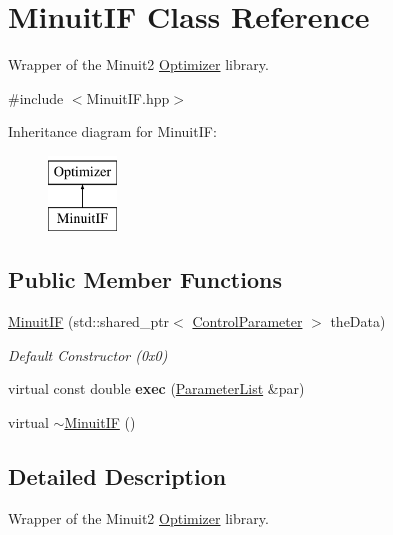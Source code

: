\hypertarget{class_minuit_i_f}{\section{Minuit\-I\-F Class Reference}
\label{class_minuit_i_f}
}


Wrapper of the Minuit2 \hyperlink{class_optimizer}{Optimizer} library.  




{\ttfamily \#include $<$Minuit\-I\-F.\-hpp$>$}

Inheritance diagram for Minuit\-I\-F\-:\begin{figure}[H]
\begin{center}
\leavevmode
\includegraphics[height=2.000000cm]{class_minuit_i_f}
\end{center}
\end{figure}
\subsection*{Public Member Functions}
\begin{DoxyCompactItemize}
\item 
\hypertarget{class_minuit_i_f_a5c028396ab6a986ab35769fc8376cad8}{\hyperlink{class_minuit_i_f_a5c028396ab6a986ab35769fc8376cad8}{Minuit\-I\-F} (std\-::shared\-\_\-ptr$<$ \hyperlink{class_control_parameter}{Control\-Parameter} $>$ the\-Data)}\label{class_minuit_i_f_a5c028396ab6a986ab35769fc8376cad8}

\begin{DoxyCompactList}\small\item\em Default Constructor (0x0) \end{DoxyCompactList}\item 
\hypertarget{class_minuit_i_f_a3d4d3722bafc5928e6fbff32b1e6072e}{virtual const double {\bfseries exec} (\hyperlink{class_parameter_list}{Parameter\-List} \&par)}\label{class_minuit_i_f_a3d4d3722bafc5928e6fbff32b1e6072e}

\item 
virtual \hyperlink{class_minuit_i_f_a922922a4e2463dde4d4fccd0c667f588}{$\sim$\-Minuit\-I\-F} ()
\end{DoxyCompactItemize}


\subsection{Detailed Description}
Wrapper of the Minuit2 \hyperlink{class_optimizer}{Optimizer} library. 

